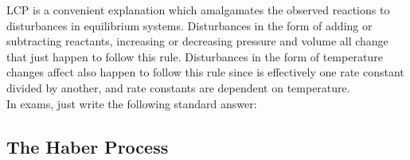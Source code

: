 \documentclass[../main]{subfiles}
\begin{document}
	LCP is a convenient explanation which amalgamates the observed reactions to disturbances in equilibrium systems. Disturbances in the form of adding or subtracting reactants, increasing or decreasing pressure and volume all change  that just happen to follow this rule. Disturbances in the form of temperature changes affect  also happen to follow this rule since  is effectively one rate constant divided by another, and rate constants are dependent on temperature. \\

	In exams, just write the following standard answer: \\

	\subsection{The Haber Process}
\end{document}
